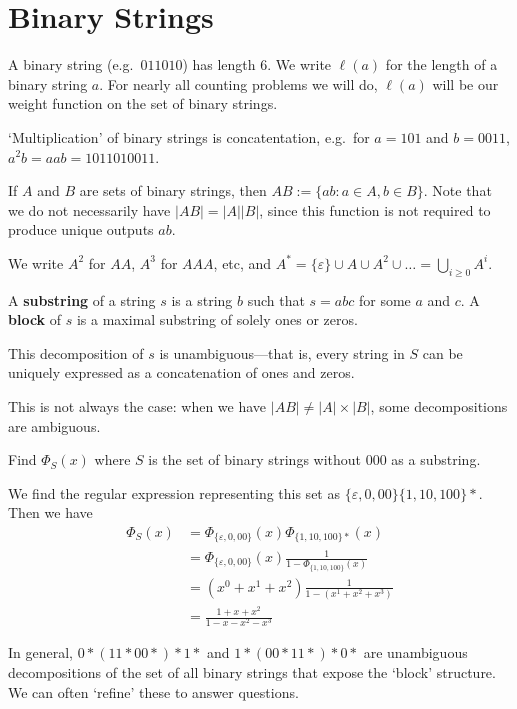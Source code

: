\documentclass[12pt]{article}
\begin{document}
\section{Binary Strings}
A binary string (e.g.\ $011010$) has length 6. We write $\ell(a)$ for the length of a binary string $a$. For nearly all counting problems we will do, $\ell(a)$ will be our weight function on the set of binary strings.

`Multiplication' of binary strings is concatentation, e.g.\ for $a = 101$ and $b = 0011$, $a^2b = aab = 1011010011$.

If $A$ and $B$ are sets of binary strings, then $AB := \{ab: a \in A, b \in B\}$. Note that we do not necessarily have $|AB| = |A||B|$, since this function is not required to produce unique outputs $ab$.

We write $A^2$ for $AA$, $A^3$ for $AAA$, etc, and $A^* = \{\varepsilon\} \cup A \cup A^2 \cup \dots = \displaystyle\bigcup_{i\geq 0} A^i$.

A {\bf substring} of a string $s$ is a string $b$ such that $s = abc$ for some $a$ and $c$. A {\bf block} of $s$ is a maximal substring of solely ones or zeros.

This decomposition of $s$ is unambiguous---that is, every string in $S$ can be uniquely expressed as a concatenation of ones and zeros.

This is not always the case: when we have $|AB| \neq |A| \times |B|$, some decompositions are ambiguous.

\begin{example}
Find $\Phi_S(x)$ where $S$ is the set of binary strings without $000$ as a substring.

We find the regular expression representing this set as $\{\varepsilon, 0, 00\}\{1, 10, 100\}*$. Then we have
\begin{align*}
\Phi_{S}(x) &= \Phi_{\{\varepsilon,0,00\}}(x) \Phi_{\{1,10,100\}*}(x)\\
&= \Phi_{\{\varepsilon,0,00\}}(x) \frac{1}{1 - \Phi_{\{1,10,100\}}(x)}\\
&= (x^0 + x^1 + x^2) \frac{1}{1 - (x^1 + x^2 + x^3)}\\
&= \frac{1 + x + x^2}{1 - x - x^2 - x^3}
\end{align*}
\end{example}

In general, $0*(11*00*)*1*$ and $1*(00*11*)*0*$ are unambiguous decompositions of the set of all binary strings that expose the `block' structure. We can often `refine' these to answer questions.
\end{document}
